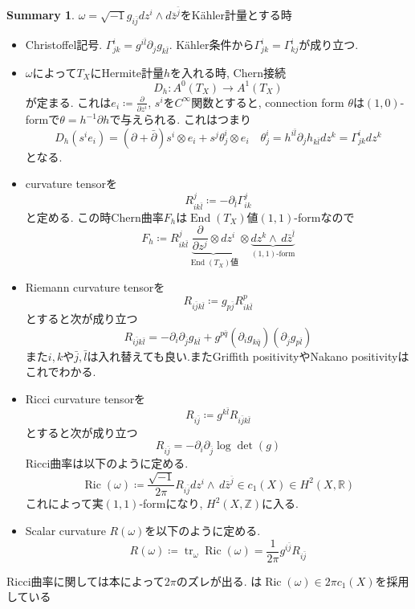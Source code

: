 \documentclass[dvipdfmx,a4paper,11pt]{article} %
\theoremstyle{definition}
\newtheorem{suma}[thm]{Summary}
\theoremstyle{remark}
\numberwithin{equation}{section}
\newcommand{\End}[0]{\operatorname{End}}
\DeclareMathOperator{\Ric}{Ric}
\newcommand{\R}{\mathbb{R}}
\newcommand{\Z}{\mathbb{Z}}
\begin{document}
\begin{tcolorbox}[mybox]
\begin{suma}
\label{suma-brief-diff}
$\omega=\sqrt{-1}g_{i \bar{j}} dz^i \wedge d \bar{z}^{\bar{j}}$をK\"ahler計量とする時
\begin{itemize}
\item Christoffel記号. $\Gamma_{jk}^{i} = g^{i\bar{l}} \partial_j g_{k\bar{l}} $. 
K\"ahler条件から$\Gamma_{jk}^{i} = \Gamma_{kj}^{i}$が成り立つ. 
\item $\omega$によって$T_X$にHermite計量$h$を入れる時, Chern接続 
\[
D_h \colon A^0(T_X) \to A^{1}(T_X)
\]
が定まる. これは$e_i\coloneqq \frac{\partial}{\partial z^i}$, $s^i$を$C^\infty$関数とすると, connection form $\theta$は$(1,0)$-formで$\theta=h^{-1} \partial h$で与えられる. これはつまり
\[
D_h (s^i e_i) = (\partial + \bar\partial)s^i \otimes e_i + s^j \theta^{i}_{j} \otimes e_i
\quad
\theta^{i}_{j} = h^{i \bar{l}}\partial_j h_{k \bar{l}} dz^k =\Gamma_{jk}^{i} dz^k
\]
となる. 
\item curvature tensorを
\[
R^{j}_{i k \bar{l}}\coloneqq  - \partial_{\bar{l}}\Gamma^{j}_{ik}
\]
と定める. この時Chern曲率$F_h$は$\End(T_X)$値$(1,1)$-formなので
\[
F_h \coloneqq R^{j}_{i k \bar{l}}
\underbrace{\frac{\partial}{\partial z^{j}}\otimes dz^i}_{\text{$\End(T_X)$値}} 
\otimes \underbrace{dz^k \wedge\,d\bar{z}^{\bar{l}}}_{\text{$(1,1)$-form}}
\]
\item Riemann curvature tensorを
\[
R_{i \bar{j}k \bar{l}}\coloneqq  g_{p\bar{j}} R^{p}_{i k \bar{l}}
\]とすると次が成り立つ
\begin{equation*}
R_{i \bar{j}k \bar{l}} = -\partial_i \partial_{\bar{j}} g_{k \bar{l}}
+g^{p\bar{q}}(\partial_i g_{k \bar{q}})(\partial_{\bar{j}}g_{p\bar{l}})
\end{equation*}
また$i,k$や$\bar{j}, \bar{l}$は入れ替えても良い.またGriffith positivityやNakano positivityはこれでわかる.
\item Ricci curvature tensorを
\[
R_{i\bar{j}}\coloneqq g^{k \bar{l}}R_{i \bar{j}k \bar{l}} 
\]
とすると次が成り立つ
\[
R_{i \bar{j}} = -\partial_i \partial_{\bar{j}} \log \det(g)
\]
Ricci曲率は以下のように定める. 
\[
\Ric(\omega)\coloneqq  \frac{\sqrt{-1}}{2 \pi} R_{i\bar{j}}dz^i \wedge\,d\bar{z}^{\bar{j}}
\in c_1(X) \in H^{2}(X, \R)
\]
これによって実$(1,1)$-formになり, $H^{2}(X, \Z)$に入る. 
\item Scalar curvature $R(\omega)$を以下のように定める. 
\[
R(\omega)\coloneqq  \operatorname{tr}_{\omega}\Ric(\omega)=
\frac{1}{2 \pi} g^{i\bar{j}}R_{i\bar{j}}
\]
\end{itemize}
\end{suma}
\end{tcolorbox}
Ricci曲率に関しては本によって$2\pi$のズレが出る. 
\cite{Sze14}は$\Ric(\omega) \in 2 \pi c_1(X)$を採用している
\end{document}
